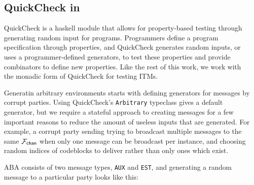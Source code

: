 \subsection{QuickCheck in \us}
QuickCheck is a haskell module that allows for property-based testing through generating random input for programs.
Programmers define a program specification through properties, and QuickCheck generates random inputs, or uses a programmer-defined generators, to test these properties and provide combinators to define new properties. 
Like the rest of this work, we work with the monadic form of QuickCheck for testing \us ITMs.

Generatin arbitrary environments starts with defining generators for messages by corrupt parties. 
Using QuickCheck's \texttt{Arbitrary} typeclass gives a default generator, but we require a stateful approach to creating messages for a few important reasons to reduce the amount of useless inputs that are generated. 
For example, a corrupt party sending trying to broadcast multiple messages to the same $\mathcal{F}_{{\mathsf {chan}}}$ when only one message can be broadcast per instance, and choosing random indices of codeblocks to deliver rather than only ones which exist.

ABA consists of two message types, \texttt{AUX} and \texttt{EST}, and generating a random message to a particular party looks like this:



